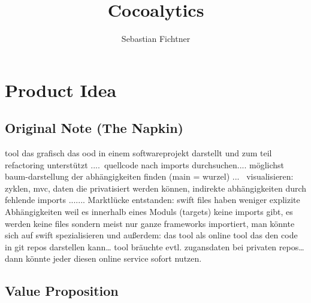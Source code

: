 \documentclass{article}
\title{Cocoalytics}
\author{Sebastian Fichtner}
\begin{document}
\maketitle
\newpage

\tableofcontents
\newpage

\section{Product Idea}

\subsection{Original Note (The Napkin)}

tool das grafisch das ood in einem softwareprojekt darstellt und zum teil refactoring unterstützt .... quellcode nach imports durchsuchen.... möglichst baum-darstellung der abhängigkeiten finden (main = wurzel) ...  visualisieren: zyklen, mvc, daten die privatisiert werden können, indirekte abhängigkeiten durch fehlende imports ....... Marktlücke entstanden: swift files haben weniger explizite Abhängigkeiten weil es innerhalb eines Moduls (targets) keine imports gibt, es werden keine files sondern meist nur ganze frameworks importiert, man könnte sich auf swift spezialisieren und außerdem: das tool als online tool das den code in git repos darstellen kann… tool bräuchte evtl. zugansdaten bei privaten repos… dann könnte jeder diesen online service sofort nutzen.

\subsection{Value Proposition}
\end{document}
